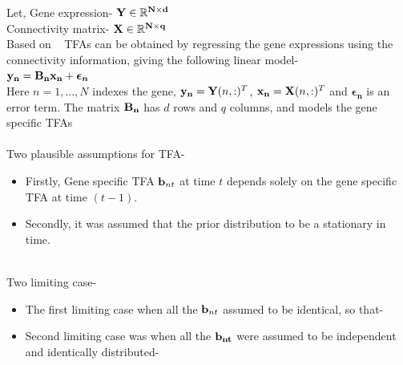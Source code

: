 \documentclass[a4paper,10pt]{report}
\begin{document}
Let, Gene expression- $ \bold{Y} \in \mathbb{R} ^ { \bold{N} \times \bold{d} } $ \\
Connectivity matrix- $ \bold{X} \in \mathbb{R} ^ { \bold{N} \times \bold{q} } $ \\

Based on ~\cite{sanguinetti:01} TFAs can be obtained by regressing the gene expressions using the connectivity information, giving the following linear model- \\
	 { \centering  $ \bold{y_{n}} = \bold{B_{n}} \bold{x_{n}} + \boldsymbol{\epsilon_{n}}$ } \\

Here $n = 1, . . . ,N$ indexes the gene, $ \bold{y_{n}} = \bold{Y}(n,:)^T $, $ \bold{x_{n}} = \bold{X}(n,:)^T $ and  $ \boldsymbol{\epsilon_{n}} $ is an error term. The matrix $ \bold{B_{n}} $ has $ d $ rows and $ q $ columns, and models the gene specific TFAs \\~\\
      
Two plausible assumptions for TFA-
\begin{itemize}
\item Firstly, Gene specific TFA $ \bold{b}_{nt} $ at time $ t $ depends solely on the gene specific TFA at time $ (t-1) $. 
\item Secondly, it was assumed that the prior distribution to be a stationary in time. \\~\\
\end {itemize}
      
Two limiting case-
\begin{itemize}
\item The first limiting case when all the $ \bold{b}_{nt} $ assumed to be identical, so that- \\
\raggedright
\item Second limiting case was when all the $ \bold{ b_{nt}} $ were assumed to be independent and identically distributed- \\ 

\end{itemize}
      
\end{document}
